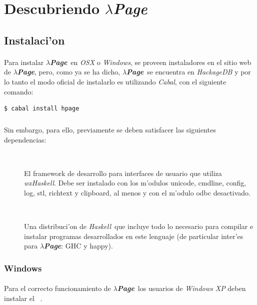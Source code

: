 \documentclass[a4paper]{article}
\newcommand{\haskell}{\textsl{Haskell}}
\newcommand{\hpage}{\textbf{\textsl{$\lambda$Page}}}
\newcommand{\cabal}{\textsl{Cabal}}
\begin{document}
\section{Descubriendo \hpage}
\subsection{Instalaci'on}
\begin{epigraphs}
\end{epigraphs}
\paragraph{}Para instalar \hpage\ en \textsl{OSX} o \textsl{Windows}, se proveen instaladores en el sitio web de \hpage, pero, como ya se ha dicho, \hpage\ se encuentra en \textsl{HackageDB} y por lo tanto el modo oficial de instalarlo es utilizando \cabal, con el siguiente comando:
\lstset{language=sh, frame=single, tabsize=2}
\begin{center}\begin{lstlisting}
$ cabal install hpage
\end{lstlisting}\end{center}
\subparagraph{}Sin embargo, para ello, previamente se deben satisfacer las siguientes dependencias:
\begin{description}
	\item[~\cite{wxwidgets}] El framework de desarrollo para interfaces de usuario que utiliza \textsl{wxHaskell}.  Debe ser instalado con los m'odulos unicode, cmdline, config, log, stl, richtext y clipboard, al menos y con el m'odulo odbc desactivado.
	\item[~\cite{platform}] Una distribuci'on de \haskell\ que incluye todo lo necesario para compilar e instalar programas desarrollados en este lenguaje (de particular inter'es para \hpage: GHC y happy).
\end{description}
\subsubsection{Windows}
\paragraph{}Para el correcto funcionamiento de \hpage\ los usuarios de \textsl{Windows XP} deben instalar el ~\cite{cppsp1}.
\end{document}
